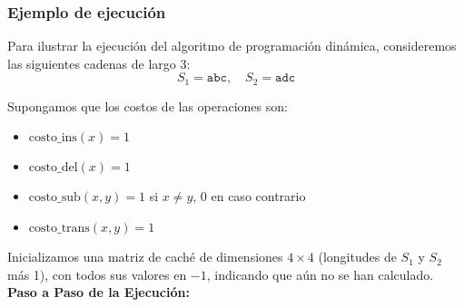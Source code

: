\subsubsection{Ejemplo de ejecución}
Para ilustrar la ejecución del algoritmo de programación dinámica, consideremos las siguientes cadenas de largo 3:  
\[
S_1 = \texttt{abc}, \quad S_2 = \texttt{adc}
\]

Supongamos que los costos de las operaciones son:  
\begin{itemize}
    \item \( \text{costo\_ins}(x) = 1 \)
    \item \( \text{costo\_del}(x) = 1 \)
    \item \( \text{costo\_sub}(x, y) = 1 \) si \( x \neq y \), \( 0 \) en caso contrario
    \item \( \text{costo\_trans}(x, y) = 1 \)
\end{itemize}

Inicializamos una matriz de caché de dimensiones \( 4 \times 4 \) (longitudes de \( S_1 \) y \( S_2 \) más 1), con todos sus valores en \(-1\), indicando que aún no se han calculado.\\

\textbf{Paso a Paso de la Ejecución: }

